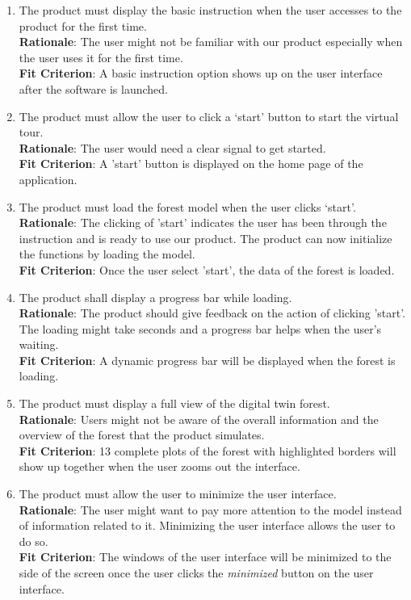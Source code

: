 \documentclass{article}
\begin{document}
\begin{enumerate}[FR1]
	\item The product must display the basic instruction when the user accesses to the product for the first time.\\
	\textbf{Rationale}: The user might not be familiar with our product especially when the user uses it for the first time.\\
	\textbf{Fit Criterion}: A basic instruction 
	option shows up on the user interface after the software is launched. 
	
	\item The product must allow the user to click a ‘start’ button to start the virtual tour.\\
	\textbf{Rationale}: The user would need a clear signal to get started.\\
	\textbf{Fit Criterion}: A 'start' button is displayed on the home page of the application.
	
	\item The product must load the forest model when the user clicks ‘start’.\\
	\textbf{Rationale}: The clicking of 'start' indicates the user has been through the instruction and is ready to use our product. The product can now initialize the functions by loading the model.\\
	\textbf{Fit Criterion}: Once the user select 'start', the data of the forest is loaded.
	
	\item The product shall display a progress bar while loading. \\
	\textbf{Rationale}: The product should give feedback on the action of clicking 'start'. The loading might take seconds and a progress bar helps when the user's waiting. \\
	\textbf{Fit Criterion}: A dynamic progress bar will be displayed when the forest is loading.
	
	\item The product must display a full view of the digital twin forest.\\
	\textbf{Rationale}: Users might not be aware of the overall information and the overview of the forest that the product simulates.\\
	\textbf{Fit Criterion}: 13 complete plots of the forest with highlighted borders will show up together when the user zooms out the interface.
    
    \item The product must allow the user to minimize the user interface. \\
    \textbf{Rationale}: The user might want to pay more attention to the model instead of information related to it. Minimizing the user interface allows the user to do so. \\
	\textbf{Fit Criterion}: The windows of the user interface will be minimized to the side of the screen once the user clicks the \textit{minimized} button on the user interface.
	

\end{enumerate}
\end{document}
